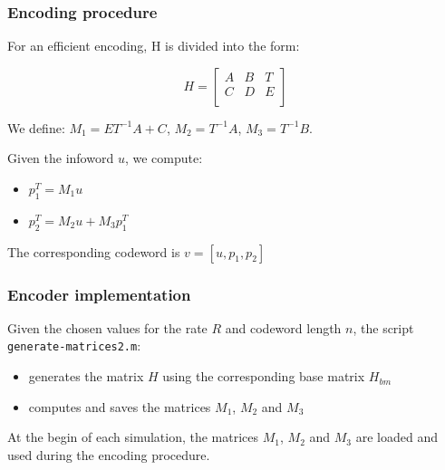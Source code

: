 \documentclass[]{beamer}
\begin{document}
\begin{frame}
\transwipe[direction=0]
\frametitle{Encoding procedure}
For an efficient encoding, H is divided into the form:

\begin{equation*}
H = 
	\begin{bmatrix}
		A & B & T \\
		C & D & E \\
	\end{bmatrix}
\end{equation*}

We define: $M_1 = ET^{-1}A+C$, $M_2 = T^{-1}A$, $M_3 = T^{-1}B$.%

\vspace{0.5cm}

Given the infoword $u$, we compute:
\begin{itemize}
\item $p_1^T = M_1u$
\item $p_2^T = M_2u + M_3p_1^T$
\end{itemize}
The corresponding codeword is $v = [u, p_1, p_2]$ 
\end{frame}


\begin{frame}
\transwipe[direction=0]
\frametitle{Encoder implementation}
Given the chosen values for the rate $R$ and codeword length $n$, the script \texttt{generate-matrices2.m}:
\begin{itemize}
\item generates the matrix $H$ using the corresponding base matrix $H_{bm}$
\item computes and saves the matrices $M_1$, $M_2$ and $M_3$
\end{itemize}

\vspace{0.5cm}

At the begin of each simulation, the matrices $M_1$, $M_2$ and $M_3$ are loaded and used during the encoding procedure.


\end{frame}
\end{document}
